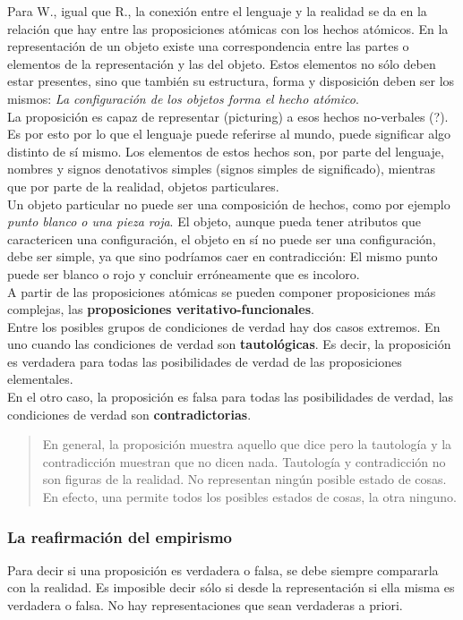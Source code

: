 \documentclass[a4paper, 11pt, twocolumn, spanish]{article}
\begin{document}
Para W., igual que R., la conexión entre el lenguaje y la realidad se
da en la relación que hay entre las proposiciones atómicas con los
hechos atómicos. En la representación de un objeto existe una
correspondencia entre las partes o elementos de la representación y
las del objeto. Estos elementos no sólo deben estar presentes, sino
que también su estructura, forma y disposición deben ser los mismos:
\emph{La configuración de los objetos forma el hecho atómico}.\\

La proposición es capaz de representar (picturing) a esos hechos
no-verbales (?). Es por esto por lo que el lenguaje puede referirse al
mundo, puede significar algo distinto de sí mismo. Los elementos de
estos hechos son, por parte del lenguaje, nombres y signos denotativos
simples (signos simples de significado), mientras que por parte de la
realidad, objetos particulares.\\

Un objeto particular no puede ser una composición de hechos, como por
ejemplo \emph{punto blanco o una pieza roja}. El objeto, aunque pueda tener
atributos que caractericen una configuración, el objeto en sí no puede
ser una configuración, debe ser simple, ya que sino podríamos caer en
contradicción: El mismo punto puede ser blanco o rojo y concluir
erróneamente que es incoloro.\\

A partir de las proposiciones atómicas se pueden componer
proposiciones más complejas, las \textbf{proposiciones
veritativo-funcionales}.\\

Entre los posibles grupos de condiciones de verdad hay dos casos
extremos. En uno cuando las condiciones de verdad son \textbf{tautológicas}. Es
decir, la proposición es verdadera para todas las posibilidades de
verdad de las proposiciones elementales.\\
En el otro caso, la proposición es falsa para todas las posibilidades
de verdad, las condiciones de verdad son \textbf{contradictorias}.
\begin{quote}
En general, la proposición muestra aquello que dice pero la tautología
y la contradicción muestran que no dicen nada. Tautología y
contradicción no son figuras de la realidad. No representan ningún
posible estado de cosas. En efecto, una permite todos los posibles
estados de cosas, la otra ninguno.
\end{quote}

\subsubsection{La reafirmación del empirismo}
\label{sec:org2132831}
Para decir si una proposición es verdadera o falsa, se debe siempre
compararla con la realidad. Es imposible decir sólo si desde la
representación si ella misma es verdadera o falsa. No hay
representaciones que sean verdaderas a priori.\\
\end{document}
